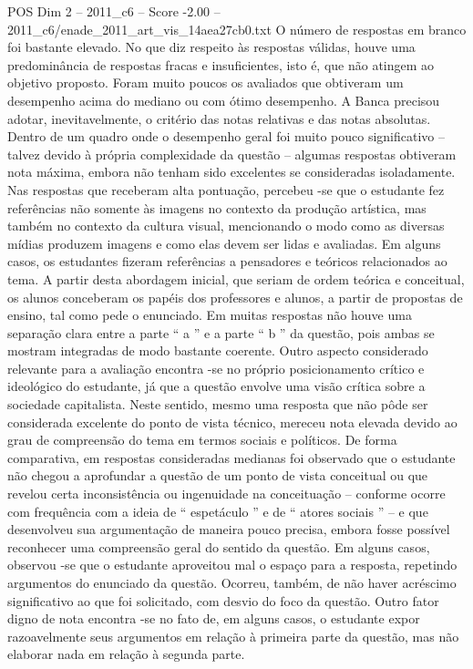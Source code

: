 \begin{textsample}{POS Dim 2 – 2011\_c6 – Score -2.00 – 2011\_c6/enade\_2011\_art\_vis\_14aea27cb0.txt}
O número de respostas em branco foi bastante elevado.
No que diz respeito às respostas válidas, houve uma predominância de respostas fracas e insuficientes, isto é, que não atingem ao objetivo proposto.
Foram muito poucos os avaliados que obtiveram um desempenho acima do mediano ou com ótimo desempenho.
A Banca precisou adotar, inevitavelmente, o critério das notas relativas e das notas absolutas.
Dentro de um quadro onde o desempenho geral foi muito pouco significativo – talvez devido à própria complexidade da questão – algumas respostas obtiveram nota máxima, embora não tenham sido excelentes se consideradas isoladamente.
Nas respostas que receberam alta pontuação, percebeu -se que o estudante fez referências não somente às imagens no contexto da produção artística, mas também no contexto da cultura visual, mencionando o modo como as diversas mídias produzem imagens e como elas devem ser lidas e avaliadas.
Em alguns casos, os estudantes fizeram referências a pensadores e teóricos relacionados ao tema.
A partir desta abordagem inicial, que seriam de ordem teórica e conceitual, os alunos conceberam os papéis dos professores e alunos, a partir de propostas de ensino, tal como pede o enunciado.
Em muitas respostas não houve uma separação clara entre a parte “ a ” e a parte “ b ” da questão, pois ambas se mostram integradas de modo bastante coerente.
Outro aspecto considerado relevante para a avaliação encontra -se no próprio posicionamento crítico e ideológico do estudante, já que a questão envolve uma visão crítica sobre a sociedade capitalista.
Neste sentido, mesmo uma resposta que não pôde ser considerada excelente do ponto de vista técnico, mereceu nota elevada devido ao grau de compreensão do tema em termos sociais e políticos.
De forma comparativa, em respostas consideradas medianas foi observado que o estudante não chegou a aprofundar a questão de um ponto de vista conceitual ou que revelou certa inconsistência ou ingenuidade na conceituação – conforme ocorre com frequência com a ideia de “ espetáculo ” e de “ atores sociais ” – e que desenvolveu sua argumentação de maneira pouco precisa, embora fosse possível reconhecer uma compreensão geral do sentido da questão.
Em alguns casos, observou -se que o estudante aproveitou mal o espaço para a resposta, repetindo argumentos do enunciado da questão.
Ocorreu, também, de não haver acréscimo significativo ao que foi solicitado, com desvio do foco da questão.
Outro fator digno de nota encontra -se no fato de, em alguns casos, o estudante expor razoavelmente seus argumentos em relação à primeira parte da questão, mas não elaborar nada em relação à segunda parte.

\end{textsample}
